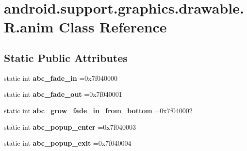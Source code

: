 \hypertarget{classandroid_1_1support_1_1graphics_1_1drawable_1_1R_1_1anim}{}\section{android.\+support.\+graphics.\+drawable.\+R.\+anim Class Reference}
\label{classandroid_1_1support_1_1graphics_1_1drawable_1_1R_1_1anim}
\subsection*{Static Public Attributes}
\begin{DoxyCompactItemize}
\item 
\mbox{\label{classandroid_1_1support_1_1graphics_1_1drawable_1_1R_1_1anim_a90dfed749328f06f9b9d50d576d31fbc}} 
static int {\bfseries abc\+\_\+fade\+\_\+in} =0x7f040000
\item 
\mbox{\label{classandroid_1_1support_1_1graphics_1_1drawable_1_1R_1_1anim_a5fee333a31d0bfc28500294a154417d6}} 
static int {\bfseries abc\+\_\+fade\+\_\+out} =0x7f040001
\item 
\mbox{\label{classandroid_1_1support_1_1graphics_1_1drawable_1_1R_1_1anim_a55f0087a449edd07b5045bf4e4004ec5}} 
static int {\bfseries abc\+\_\+grow\+\_\+fade\+\_\+in\+\_\+from\+\_\+bottom} =0x7f040002
\item 
\mbox{\label{classandroid_1_1support_1_1graphics_1_1drawable_1_1R_1_1anim_a08b51dc9c97f8ae4c8cc19a3e6982261}} 
static int {\bfseries abc\+\_\+popup\+\_\+enter} =0x7f040003
\item 
\mbox{\label{classandroid_1_1support_1_1graphics_1_1drawable_1_1R_1_1anim_a48b94e700aa58372373831d1be16bd2a}} 
static int {\bfseries abc\+\_\+popup\+\_\+exit} =0x7f040004
\item 
\mbox{\label{classandroid_1_1support_1_1graphics_1_1drawable_1_1R_1_1anim_ac8168a587c75f7a0128378fca8e638db}} 

\end{DoxyCompactItemize}
